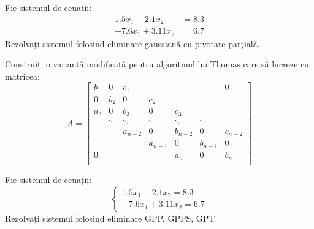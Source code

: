 \documentclass{exam}
\begin{document}
\begin{questions}
	\boxedpoints
	\pointsinmargin

	\question Fie sistemul de ecuații:
	\begin{align*}
		1.5  x_1 - 2.1  x_2    & = 8.3 \\
		-7.6   x_1 + 3.11  x_2 & = 6.7
	\end{align*}
	Rezolva\c{t}i sistemul folosind eliminare gaussian\u{a} cu pivotare par\c{t}ial\u{a}.


	\question Construiți o variantă modificată pentru algoritmul lui Thomas care
	să lucreze cu matricea:
	\begin{equation*}
		A = \begin{bmatrix}
			b_1 & 0      & c_1       &           &           &           & 0         \\
			0   & b_2    & 0         & c_2       &           &           &           \\
			a_3 & 0      & b_3       & 0         & c_3       &           &           \\
			    & \ddots & \ddots    & \ddots    & \ddots    & \ddots    &           \\
			    &        & a_{n - 2} & 0         & b_{n - 2} & 0         & c_{n - 2} \\
			    &        &           & a_{n - 1} & 0         & b_{n - 1} & 0         \\
			0   &        &           &           & a_n       & 0         & b_n       \\
		\end{bmatrix}
	\end{equation*}

	\question Fie sistemul de ecua\c{t}ii:
	\begin{equation*}
		\begin{cases}
			1.5  x_1 - 2.1 x_2 = 8.3 \\
			-7.6 x_1 + 3.11 x_2 = 6.7
		\end{cases}
	\end{equation*}
	Rezolvați sistemul folosind eliminare GPP, GPPS, GPT.

\end{questions}
\end{document}
